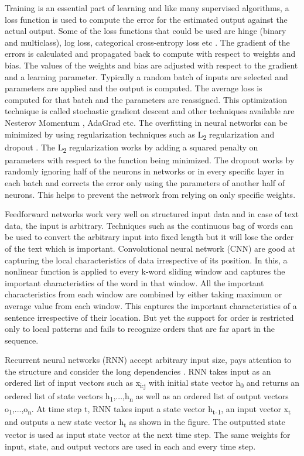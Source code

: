 \documentclass[a4paper, 11pt]{article}
\begin{document}
Training is an essential part of learning and like many supervised algorithms, a loss function is used to compute the error for the estimated output against the actual output. Some of the loss functions that could be used are hinge (binary and multiclass), log loss, categorical cross-entropy loss etc \cite{Goldberg2016}. The gradient of the errors is calculated and propagated back to compute with respect to weights and bias. The values of the weights and bias are adjusted with respect to the gradient and a learning parameter. Typically a random batch of inputs are selected and parameters are applied and the output is computed. The average loss is computed for that batch and the parameters are reassigned. This optimization technique is called stochastic gradient descent \cite{Bottou2012} and other techniques available are Nesterov Momentum \cite{Sutskever2013}, AdaGrad \cite{Duchi2011} etc. The overfitting in neural networks can be minimized by using regularization techniques such as L\textsubscript{2} regularization and dropout \cite{Hinton2012}. The L\textsubscript{2} regularization works by adding a squared penalty on parameters with respect to the function being minimized. The dropout works by randomly ignoring half of the neurons in networks or in every specific layer in each batch and corrects the error only using the parameters of another half of neurons. This helps to prevent the network from relying on only specific weights. 

Feedforward networks work very well on structured input data and in case of text data, the input is arbitrary. Techniques such as the continuous bag of words \cite{DBLP:journals/corr/abs-1301-3781} can be used to convert the arbitrary input into fixed length but it will lose the order of the text which is important. Convolutional neural network (CNN) \cite{Bengio1997} are good at capturing the local characteristics of data irrespective of its position. In this, a nonlinear function is applied to every k-word sliding window and captures the important characteristics of the word in that window. All the important characteristics from each window are combined by either taking maximum or average value from each window. This captures the important characteristics of a sentence irrespective of their location. But yet the support for order is restricted only to local patterns and fails to recognize orders that are far apart in the sequence.

Recurrent neural networks (RNN) accept arbitrary input size, pays attention to the structure and consider the long dependencies \cite{Elman}. RNN takes input as an ordered list of input vectors such as x\textsubscript{i:j} with initial state vector h\textsubscript{0} and returns an ordered list of state vectors h\textsubscript{1},...,h\textsubscript{n} as well as an ordered list of output vectors o\textsubscript{1},...,o\textsubscript{n}. At time step t, RNN takes input a state vector h\textsubscript{t-1}, an input vector x\textsubscript{t} and outputs a new state vector h\textsubscript{t} as shown in the figure. The outputted state vector is used as input state vector at the next time step. The same weights for input, state, and output vectors are used in each and every time step.   
\end{document}
